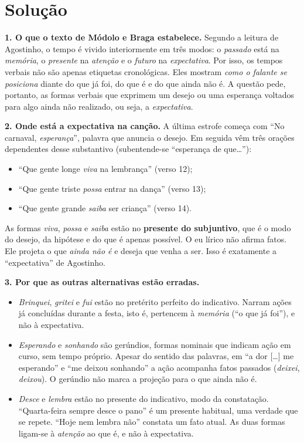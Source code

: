 \documentclass{article}%
\begin{document}
\section*{Solução}

\textbf{1. O que o texto de Módolo e Braga estabelece.} Segundo a leitura de Agostinho, o tempo é vivido interiormente em três modos: o \emph{passado} está na \emph{memória}, o \emph{presente} na \emph{atenção} e o \emph{futuro} na \emph{expectativa}. Por isso, os tempos verbais não são apenas etiquetas cronológicas. Eles mostram \emph{como o falante se posiciona} diante do que já foi, do que é e do que ainda não é. A questão pede, portanto, as formas verbais que exprimem um desejo ou uma esperança voltados para algo ainda não realizado, ou seja, a \emph{expectativa}.

\textbf{2. Onde está a expectativa na canção.} A última estrofe começa com ``No carnaval, \emph{esperança}'', palavra que anuncia o desejo. Em seguida vêm três orações dependentes desse substantivo (subentende-se ``esperança de que\ldots''):
\begin{itemize}
  \item ``Que gente longe \emph{viva} na lembrança'' (verso 12);
  \item ``Que gente triste \emph{possa} entrar na dança'' (verso 13);
  \item ``Que gente grande \emph{saiba} ser criança'' (verso 14).
\end{itemize}
As formas \emph{viva}, \emph{possa} e \emph{saiba} estão no \textbf{presente do subjuntivo}, que é o modo do desejo, da hipótese e do que é apenas possível. O eu lírico não afirma fatos. Ele projeta o que \emph{ainda não é} e deseja que venha a ser. Isso é exatamente a ``expectativa'' de Agostinho.

\textbf{3. Por que as outras alternativas estão erradas.}
\begin{itemize}
  \item[(a)] \emph{Brinquei}, \emph{gritei} e \emph{fui} estão no pretérito perfeito do indicativo. Narram ações já concluídas durante a festa, isto é, pertencem à \emph{memória} (``o que já foi''), e não à expectativa.
  \item[(b)] \emph{Esperando} e \emph{sonhando} são gerúndios, formas nominais que indicam ação em curso, sem tempo próprio. Apesar do sentido das palavras, em ``a dor [\ldots] me esperando'' e ``me deixou sonhando'' a ação acompanha fatos passados (\emph{deixei}, \emph{deixou}). O gerúndio não marca a projeção para o que ainda não é.
  \item[(c)] \emph{Desce} e \emph{lembra} estão no presente do indicativo, modo da constatação. ``Quarta-feira sempre desce o pano'' é um presente habitual, uma verdade que se repete. ``Hoje nem lembra não'' constata um fato atual. As duas formas ligam-se à \emph{atenção} ao que é, e não à expectativa.
\end{itemize}
\end{document}

